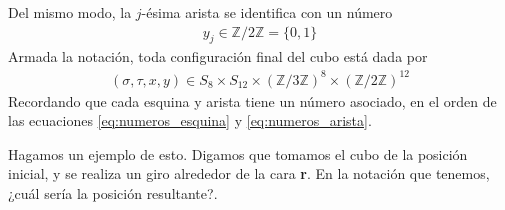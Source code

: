 \documentclass{article}
\theoremstyle{definition}
\newcommand{\Z}{\mathbb{Z}}
\renewcommand{\r}{\textbf{r}}
\begin{document}
Del mismo modo, la $j$-ésima arista se identifica con un número
\begin{align*}
    y_j\in \Z/2\Z=\{0,1\}
\end{align*}
Armada la notación, toda configuración final del cubo está dada por
\begin{align*}
    (\sigma,\tau,x,y)\in S_{8}\times S_{12}\times (\Z/3\Z)^8\times (\Z/2\Z)^{12}
\end{align*}
Recordando que cada esquina y arista tiene un número asociado, en el orden de las ecuaciones \eqref{eq:numeros_esquina} y \eqref{eq:numeros_arista}.

Hagamos un ejemplo de esto. Digamos que tomamos el cubo de la posición inicial, y se realiza un giro alrededor de la cara \r. En la notación que tenemos, ¿cuál sería la posición resultante?.
\begin{figure}
    \centering
\end{figure}
\end{document}
